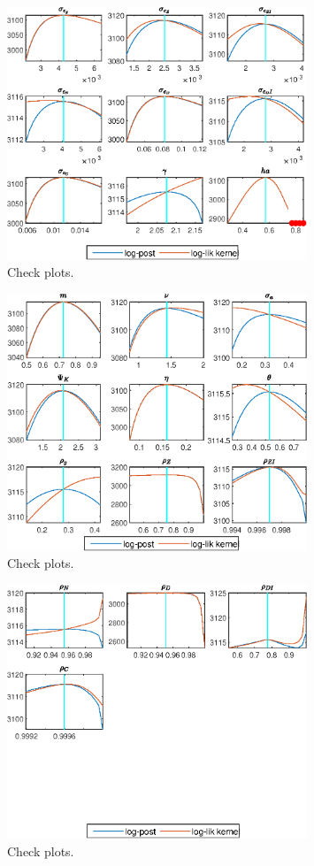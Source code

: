  
\begin{figure}[H]
\centering 
\includegraphics[width=0.80\textwidth]{BRS_growth/graphs/BRS_growth_CheckPlots1}
\caption{Check plots.}\label{Fig:CheckPlots:1}
\end{figure}
 
\begin{figure}[H]
\centering 
\includegraphics[width=0.80\textwidth]{BRS_growth/graphs/BRS_growth_CheckPlots2}
\caption{Check plots.}\label{Fig:CheckPlots:2}
\end{figure}
 
\begin{figure}[H]
\centering 
\includegraphics[width=0.80\textwidth]{BRS_growth/graphs/BRS_growth_CheckPlots3}
\caption{Check plots.}\label{Fig:CheckPlots:3}
\end{figure}
 
